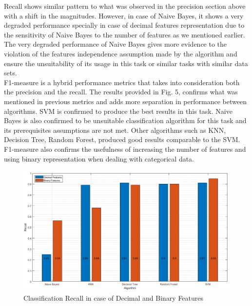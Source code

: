 \documentclass{article}
\begin{document}
Recall shows similar pattern to what was observed in the precision section above with a shift in the magnitudes. However, in case of Naive Bayes, it shows a very degraded performance specially in case of decimal features representation due to the sensitivity of Naive Bayes to the number of features as we mentioned earlier. The very degraded performance of Naive Bayes gives more evidence to the violation of the features independence assumption made by the algorithm and ensure the unsuitability of its usage in this task or similar tasks with similar data sets. \\

F1-measure is a hybrid performance metrics that takes into consideration both the precision and the recall. The results provided in Fig. 5, confirms what was mentioned in previous metrics and adds more separation in performance between algorithms. SVM is confirmed to produce the best results in this task. Naive Bayes is also confirmed to be unsuitable classification algorithm for this task and its prerequisites assumptions are not met. Other algorithms such as KNN, Decision Tree, Random Forest, produced good results comparable to the SVM. F1-measure also confirms the usefulness of increasing the number of features and using binary representation when dealing with categorical data. 


\begin{figure}[H]
\centering
\includegraphics[width=\textwidth]{../Figures/recall.png}
\caption{Classification Recall in case of Decimal and Binary Features}
\end{figure}
\end{document}
